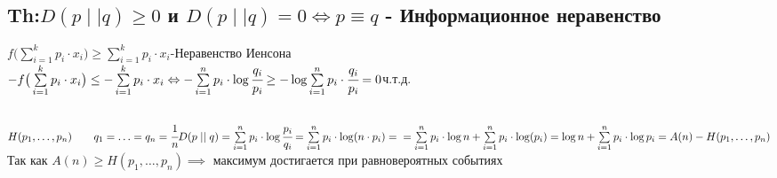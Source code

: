\documentclass[12pt]{article}
\begin{document}
\subsection{Th:$D(p\mid\mid q)\geq 0$ и $D(p\mid\mid q)=0
        \Leftrightarrow p\equiv q$ - Информационное неравенство}
$f\big ( \sum\limits_{i=1}^k p_i\cdot x_i \big ) \geq \sum\limits_{i=1}^k p_i\cdot x_i$\quad-\quad Неравенство Иенсона\\
$-f\big ( \sum\limits_{i=1}^k p_i\cdot x_i \big ) \leq -\sum\limits_{i=1}^k p_i\cdot x_i \Leftrightarrow
    -\sum\limits_{i=1}^n p_i\cdot \log \cfrac{q_i}{ p_i} \geq -\log\sum\limits_{i=1}^n p_i\cdot  \cfrac{ q_i}{p_i}=0$ч.т.д.
\subsection{}
$H(p_1,\ldots,p_n)\qquad q_1=\ldots =q_n=\cfrac{1}{n}
    D(p\mid \mid q)=\sum\limits_{i=1}^n p_i\cdot \log \cfrac{p_i}{ q_i}=\sum\limits_{i=1}^n p_i\cdot \log (n\cdot p_i)=\\=
    \sum\limits_{i=1}^n p_i\cdot \log n+
    \sum\limits_{i=1}^n p_i\cdot \log (p_i)=\log n+
    \sum\limits_{i=1}^n p_i\cdot \log p_i = A(n)-H(p_1,\ldots,p_n)$\\
Так как $A(n)\geq H(p_1,\ldots,p_n) \implies$ максимум достигается при равновероятных событиях
\end{document}
